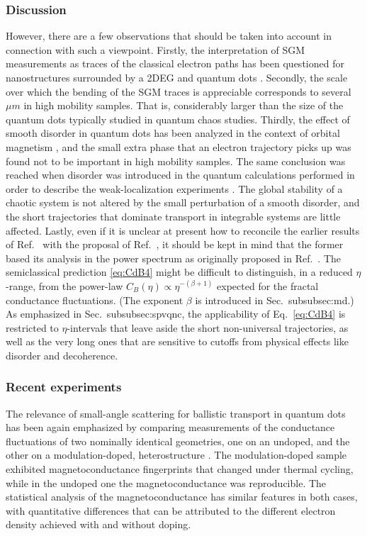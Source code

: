 \documentclass[a4paper,10pt]{article}
\newcommand{\nin}{\noindent}
\begin{document}
\subsubsection{Discussion}
\label{subsubsec:d}

\nin However, there are a few observations that should be taken into account in connection with such a viewpoint. Firstly, the interpretation of SGM measurements as traces of the classical electron paths has been questioned for nanostructures surrounded by a 2DEG
\cite{JSTW_2010,gorini2013} and quantum dots \cite{AlexDiet}. Secondly, the scale over which the bending of the SGM traces is appreciable corresponds to several $\mu m$ in high mobility samples. That is, considerably larger than the size of the quantum dots typically studied in quantum chaos studies. Thirdly, the effect of smooth disorder in quantum dots has been analyzed in the context of orbital magnetism \cite{RapComm}, and the small extra phase that an electron trajectory picks up was found not to be important in high mobility samples. The same conclusion was reached when disorder was introduced in the quantum calculations performed in order to describe the weak-localization experiments \cite{chang94}. The global stability of a chaotic system is not altered by the small perturbation of a smooth disorder, and the short trajectories that dominate transport in integrable systems are little affected. Lastly, even if it is unclear at present how to reconcile the earlier results of Ref.~\cite{Mar92} with the proposal of Ref.~\cite{Marlow06}, it should be kept in mind that the former based its analysis in the power spectrum as originally proposed in Ref.~\cite{Jal90}. The semiclassical prediction \eqref{eq:CdB4} might be difficult to distinguish, in a reduced $\eta$-range, from the power-law ${C}_B (\eta) \propto \eta^{-(\beta+1)}$ expected for the fractal conductance fluctuations. (The exponent $\beta$ is introduced in Sec.~{subsubsec:md}.) As emphasized in Sec.~{subsubsec:spvqnc}, the applicability of Eq.~\eqref{eq:CdB4} is restricted to $\eta$-intervals that leave aside the short non-universal trajectories, as well as the very long ones that are sensitive to cutoffs from physical effects like disorder and decoherence.  

\subsubsection{Recent experiments}
\label{subsubsec:re}

\nin The relevance of small-angle scattering for ballistic transport in quantum dots has been again emphasized by comparing measurements of the conductance fluctuations of two nominally identical geometries, one on an undoped, and the other on a modulation-doped, heterostructure \cite{See12}. The modulation-doped sample exhibited magnetoconductance fingerprints that changed under thermal cycling, while in the undoped one the magnetoconductance was reproducible. The   statistical analysis of the magnetoconductance has similar features in both cases, with quantitative differences that can be attributed to the different electron density achieved with and without doping.
\end{document}
